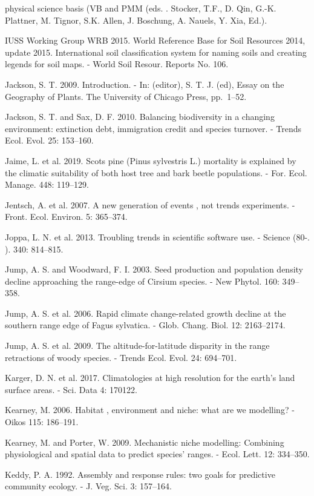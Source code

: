 \documentclass[11pt,twoside]{reedthesis}
\begin{document}
physical science basis (VB and PMM (eds. . Stocker, T.F., D. Qin, G.-K.
Plattner, M. Tignor, S.K. Allen, J. Boschung, A. Nauels, Y. Xia,
Ed.).\par
IUSS Working Group WRB 2015. World Reference Base for Soil Resources
2014, update 2015. International soil classification system for naming
soils and creating legends for soil maps. - World Soil Resour. Reports
No. 106.\par
Jackson, S. T. 2009. Introduction. - In: (editor), S. T. J. (ed), Essay
on the Geography of Plants. The University of Chicago Press,
pp.~1--52.\par
Jackson, S. T. and Sax, D. F. 2010. Balancing biodiversity in a changing
environment: extinction debt, immigration credit and species turnover. -
Trends Ecol. Evol. 25: 153--160.\par
Jaime, L. et al. 2019. Scots pine (Pinus sylvestris L.) mortality is
explained by the climatic suitability of both host tree and bark beetle
populations. - For. Ecol. Manage. 448: 119--129.\par
Jentsch, A. et al. 2007. A new generation of events , not trends
experiments. - Front. Ecol. Environ. 5: 365--374.\par
Joppa, L. N. et al. 2013. Troubling trends in scientific software use. -
Science (80-. ). 340: 814--815.\par
Jump, A. S. and Woodward, F. I. 2003. Seed production and population
density decline approaching the range-edge of Cirsium species. - New
Phytol. 160: 349--358.\par
Jump, A. S. et al. 2006. Rapid climate change-related growth decline at
the southern range edge of Fagus sylvatica. - Glob. Chang. Biol. 12:
2163--2174.\par
Jump, A. S. et al. 2009. The altitude-for-latitude disparity in the
range retractions of woody species. - Trends Ecol. Evol. 24:
694--701.\par
Karger, D. N. et al. 2017. Climatologies at high resolution for the
earth's land surface areas. - Sci. Data 4: 170122.\par
Kearney, M. 2006. Habitat , environment and niche: what are we
modelling? - Oikos 115: 186--191.\par
Kearney, M. and Porter, W. 2009. Mechanistic niche modelling: Combining
physiological and spatial data to predict species' ranges. - Ecol. Lett.
12: 334--350.\par
Keddy, P. A. 1992. Assembly and response rules: two goals for predictive
community ecology. - J. Veg. Sci. 3: 157--164.\par
\end{document}
